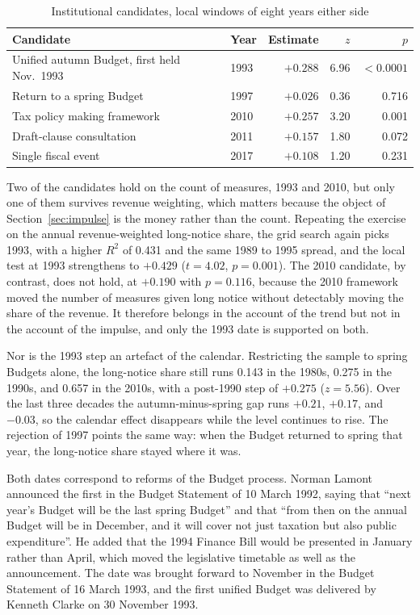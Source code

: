 \documentclass[11pt,a4paper]{article}
\begin{document}
\begin{table}[htbp]
\centering
\caption{Institutional candidates, local windows of eight years either side}
\label{tab:breaks}
\begin{tabular}{llrrr}
\toprule
Candidate & Year & Estimate & $z$ & $p$ \\
\midrule
Unified autumn Budget, first held Nov.\ 1993 & 1993 & $+0.288$ & 6.96 & $<0.0001$ \\
Return to a spring Budget & 1997 & $+0.026$ & 0.36 & 0.716 \\
Tax policy making framework & 2010 & $+0.257$ & 3.20 & 0.001 \\
Draft-clause consultation & 2011 & $+0.157$ & 1.80 & 0.072 \\
Single fiscal event & 2017 & $+0.108$ & 1.20 & 0.231 \\
\bottomrule
\end{tabular}
\end{table}

Two of the candidates hold on the count of measures, 1993 and 2010, but only one of them survives
revenue weighting, which matters because the object of Section~\ref{sec:impulse} is the money rather
than the count. Repeating the exercise on the annual revenue-weighted long-notice share, the grid
search again picks 1993, with a higher $R^2$ of 0.431 and the same 1989 to 1995 spread, and the
local test at 1993 strengthens to $+0.429$ ($t = 4.02$, $p = 0.001$). The 2010 candidate, by contrast, does not hold, at $+0.190$ with $p = 0.116$, because the 2010 framework moved the number of measures given long notice without detectably moving the share of the revenue. It therefore belongs in the account of the trend but not in the account of the impulse, and only the 1993 date is supported on both.

Nor is the 1993 step an artefact of the calendar. Restricting the sample to spring Budgets alone,
the long-notice share still runs 0.143 in the 1980s, 0.275 in the 1990s, and 0.657 in the 2010s,
with a post-1990 step of $+0.275$ ($z = 5.56$). Over the last three decades the autumn-minus-spring gap runs $+0.21$, $+0.17$, and $-0.03$, so the calendar effect disappears while the
level continues to rise. The rejection of 1997 points the same way: when the Budget returned to
spring that year, the long-notice share stayed where it was.

Both dates correspond to reforms of the Budget process. Norman Lamont announced the first in the Budget Statement of 10 March 1992, saying that ``next year's Budget will be the last spring Budget'' and that ``from then on the annual Budget will be in December, and it will cover not just taxation but also public expenditure''. He added that the 1994 Finance Bill would be presented in January rather than April, which moved the legislative timetable as well as the announcement. The date was brought
forward to November in the Budget Statement of 16 March 1993, and the first unified Budget was
delivered by Kenneth Clarke on 30 November 1993.
\end{document}
